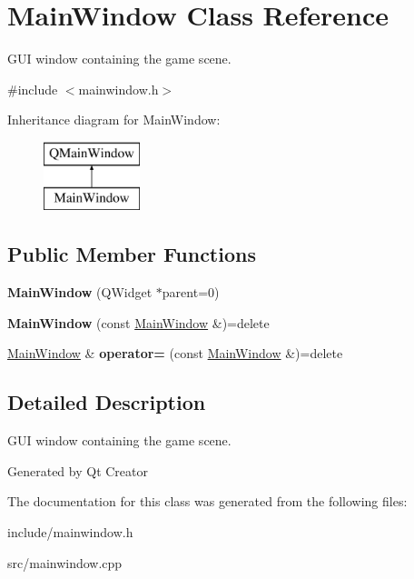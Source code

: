 \hypertarget{class_main_window}{}\section{Main\+Window Class Reference}
\label{class_main_window}


G\+UI window containing the game scene.  




{\ttfamily \#include $<$mainwindow.\+h$>$}

Inheritance diagram for Main\+Window\+:\begin{figure}[H]
\begin{center}
\leavevmode
\includegraphics[height=2.000000cm]{class_main_window}
\end{center}
\end{figure}
\subsection*{Public Member Functions}
\begin{DoxyCompactItemize}
\item 
\mbox{\label{class_main_window_a8b244be8b7b7db1b08de2a2acb9409db}} 
{\bfseries Main\+Window} (Q\+Widget $\ast$parent=0)
\item 
\mbox{\label{class_main_window_af1d822d2183a379458e4bc0e2ea2bf3b}} 
{\bfseries Main\+Window} (const \hyperlink{class_main_window}{Main\+Window} \&)=delete
\item 
\mbox{\label{class_main_window_aaa4474cfd4fdb8d3386764a6eb1a4684}} 
\hyperlink{class_main_window}{Main\+Window} \& {\bfseries operator=} (const \hyperlink{class_main_window}{Main\+Window} \&)=delete
\end{DoxyCompactItemize}


\subsection{Detailed Description}
G\+UI window containing the game scene. 

Generated by Qt Creator 

The documentation for this class was generated from the following files\+:\begin{DoxyCompactItemize}
\item 
include/mainwindow.\+h\item 
src/mainwindow.\+cpp\end{DoxyCompactItemize}
